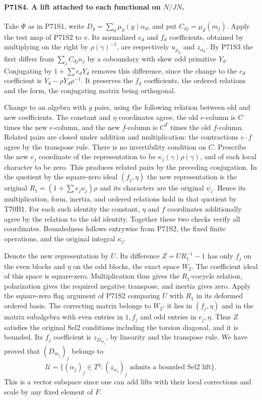 \paragraph{P71S4. A lift attached to each functional on $N/JN$.}
Take $\Phi$ as in P71S1, write $D_y=\sum_d\mu_d(y)\alpha_d$,
and put $C_{dj}=\mu_d(m_j)$. Apply the test map of P71S2 to $v$.
Its normalized $e_d$ and $f_d$ coefficients, obtained by multiplying
on the right by $\rho(\gamma)^{-1}$, are respectively
$u_{\mu_d}$ and $z_{\alpha_d}$. By P71S3 the first differs
from $\sum_j C_{dj}\kappa_j$ by a coboundary with skew odd
primitive $Y_d$. Conjugating by $1+\sum e_dY_d$ removes this
difference, since the change to the $e_d$ coefficient is
$Y_d-\rho Y_d\rho^{-1}$. It preserves the $f_d$ coefficients,
the ordered relations and the form, the conjugating matrix being
orthogonal.

Change to an algebra with $g$ pairs, using the following relation
between old and new coefficients. The constant and $\eta$
coordinates agree, the old $e$-column is $C$ times the new
$e$-column, and the new $f$-column is $C^T$ times the old
$f$-column. Related pairs are closed under addition and
multiplication: the contractions $e\cdot f$ agree by the
transpose rule. There is no invertibility condition on $C$.
Prescribe the new $e_j$ coordinate of the representation to be
$\kappa_j(\gamma)\rho(\gamma)$, and of each local character
to be zero. This produces related pairs by the preceding
conjugation. In the quotient by the square-zero ideal $(f_j,\eta)$
the new representation is the original
$R_1=(1+\sum e_j\kappa_j)\rho$ and its characters are the
original $\psi_i$. Hence its multiplication, form, inertia, and
ordered relations hold in that quotient by T70B1. For each such
identity the constant, $\eta$ and $f$ coordinates additionally
agree by the relation to the old identity. Together these two
checks verify all coordinates. Boundedness follows entrywise
from P71S2, the fixed finite operations, and the original
integral $\kappa_j$.

Denote the new representation by $U$. Its difference
$Z=U R_1^{-1}-1$ has only $f_j$ on the even blocks and $\eta$
on the odd blocks, the exact space $W_2$. The coefficient ideal
of this space is square-zero. Multiplication thus gives the
$R_1$-cocycle relation, polarization gives the required negative
transpose, and inertia gives zero. Apply the square-zero flag
argument of P71S2 comparing $U$ with $R_1$ in its deformed
ordered basis. The correcting matrix belongs to $W_2$: it lies
in $(f_j,\eta)$ and in the matrix subalgebra with even entries
in $1,f_j$ and odd entries in $e_j,\eta$. Thus $Z$ satisfies
the original $\mathrm{Sel2}$ conditions including the torsion
diagonal, and it is bounded. Its $f_j$ coefficient is
$z_{D_{m_j}}$, by linearity and the transpose rule. We have
proved that $(D_{m_j})_j$ belongs to
\[
 \mathcal U=\{(\alpha_j)_j\in T^g:
            (z_{\alpha_j})_j\text{ admits a bounded Sel2 lift}\}.
\]
This is a vector subspace since one can add lifts with their
local corrections and scale by any fixed element of $F$.

